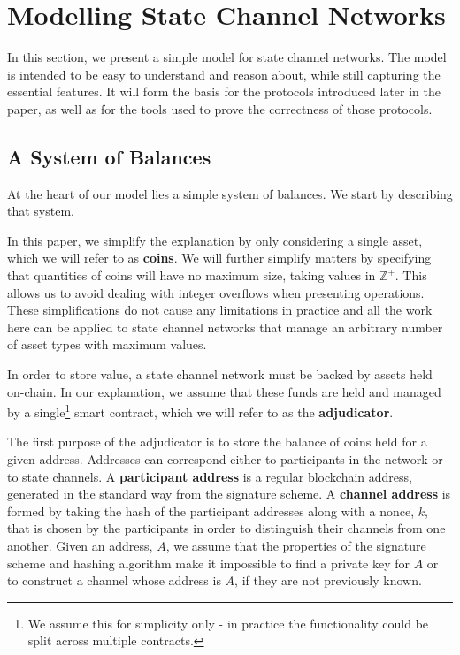 
\section{Modelling State Channel Networks}\label{sec:modelling}

In this section, we present a simple model for state channel networks.
The model is intended to be easy to understand and reason about, while still capturing the essential features.
It will form the basis for the protocols introduced later in the paper, as well as for the tools used to prove the correctness of those protocols.

\subsection{A System of Balances}

At the heart of our model lies a simple system of balances. 
We start by describing that system.

In this paper, we simplify the explanation by only considering a single asset, which we will refer to as \textbf{coins}.
We will further simplify matters by specifying that quantities of coins will have no maximum
size, taking values in $\mathbb{Z}^+$.
This allows us to avoid dealing with integer overflows when presenting operations.
These simplifications do not cause any limitations in practice and all the work
here can be applied to state channel networks that manage an arbitrary number of asset types with maximum values.

In order to store value, a state channel network must be backed by assets held on-chain.
In our explanation, we assume that these funds are held and managed by a single\footnote{
  We assume this for simplicity only - in practice the functionality could be split across multiple contracts.
} smart contract,
which we will refer to as the \textbf{adjudicator}.

The first purpose of the adjudicator is to store the balance of coins held for a given address.
Addresses can correspond either to participants in the network or to state channels.
A \textbf{participant address} is a regular blockchain address, generated in the standard way from the signature scheme.
A \textbf{channel address} is formed by taking the hash of the participant addresses along with a nonce, $k$, that is chosen by the participants in order to distinguish their channels from one another.
Given an address, $A$, we assume that the properties of the signature scheme and hashing algorithm make it impossible to find a private key for $A$ or to construct a channel whose address is $A$, if they are not previously known.

